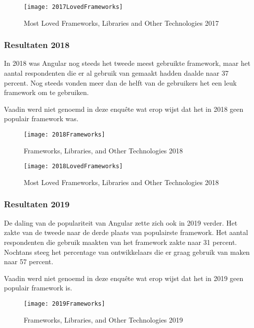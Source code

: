 \begin{figure}[H]
	\centering
	\texttt{[image: 2017LovedFrameworks]}
	\caption{Most Loved Frameworks, Libraries and Other Technologies 2017 \autocite{DeveloperSurvey2017}}
	\label{fig:Most Loved Frameworks, Libraries and Other Technologies 2017}
\end{figure}

\subsubsection{Resultaten 2018}
In 2018 was Angular nog steeds het tweede meest gebruikte framework, maar het aantal respondenten die er al gebruik van gemaakt hadden daalde naar 37 percent. Nog steeds vonden meer dan de helft van de gebruikers het een leuk framework om te gebruiken.

Vaadin werd niet genoemd in deze enquête wat erop wijst dat het in 2018 geen populair framework was.

\begin{figure}[H]
	\centering
	\texttt{[image: 2018Frameworks]}
	\caption{Frameworks, Libraries, and Other Technologies 2018 \autocite{DeveloperSurvey2018}}
	\label{fig:Frameworks, Libraries, and Other Technologies 2018}
\end{figure}

\begin{figure}[H]
	\centering
	\texttt{[image: 2018LovedFrameworks]}
	\caption{Most Loved Frameworks, Libraries and Other Technologies 2018 \autocite{DeveloperSurvey2018}}
	\label{fig:Most Loved Frameworks, Libraries and Other Technologies 2018}
\end{figure}

\subsubsection{Resultaten 2019}
De daling van de populariteit van Angular zette zich ook in 2019 verder. Het zakte van de tweede naar de derde plaats van populairste framework. Het aantal respondenten die gebruik maakten van het framework zakte naar 31 percent. Nochtans steeg het percentage van ontwikkelaars die er graag gebruik van maken naar 57 percent.

Vaadin werd niet genoemd in deze enquête wat erop wijst dat het in 2019 geen populair framework is.

\begin{figure}[H]
	\centering
	\texttt{[image: 2019Frameworks]}
	\caption{Frameworks, Libraries, and Other Technologies 2019 \autocite{DeveloperSurvey2019}}
	\label{fig:Frameworks, Libraries, and Other Technologies 2019}
\end{figure}

